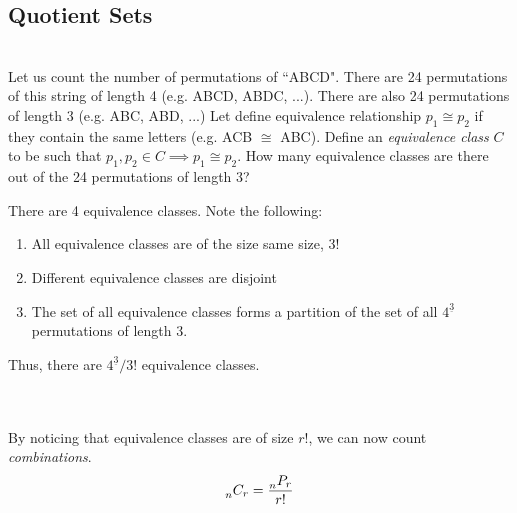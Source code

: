 

\subsection{Quotient Sets}
\begin{problem}\\
Let us count the number of permutations of ``ABCD". There are 24 permutations of this string of length 4 (e.g. ABCD, ABDC, ...). There are also 24 permutations of length 3 (e.g. ABC, ABD, ...) Let define equivalence relationship $p_1 \cong p_2$ if they contain the same letters (e.g. ACB $\cong$ ABC). Define an \emph{equivalence class} $C$ to be such that $p_1, p_2 \in C \implies p_1 \cong p_2$.
How many equivalence classes are there out of the 24 permutations of length 3?
\end{problem}
\begin{solution}
There are 4 equivalence classes. Note the following:
\begin{enumerate}
    \item All equivalence classes are of the size same size, 3!
    \item Different equivalence classes are disjoint
    \item The set of all equivalence classes forms a partition of the set of all $4^{\underline{3}}$ permutations of length 3.
\end{enumerate}
Thus, there are $4^{\underline{3}}/3!$ equivalence classes.
\end{solution} \\ \\
By noticing that equivalence classes are of size $r!$, we can now count \emph{combinations}.
\[
\prescript{}{n}{C_r} = \frac{\prescript{}{n}{P_r}}{r!}
\]
% 